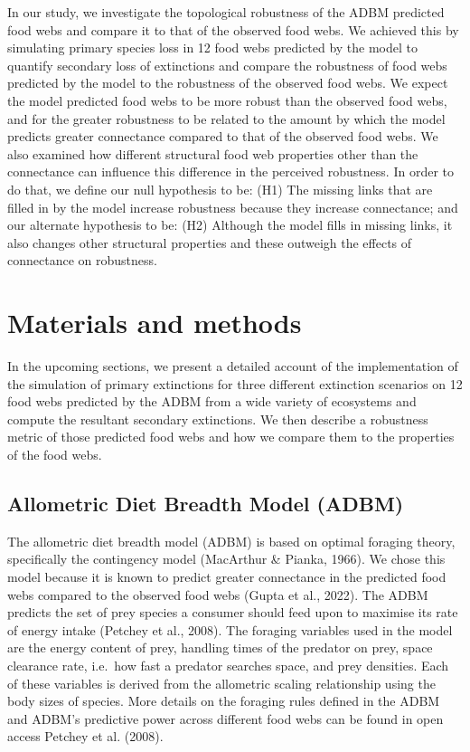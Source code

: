 \documentclass{article}
\begin{document}
In our study, we investigate the topological robustness of the ADBM
predicted food webs and compare it to that of the observed food webs. We
achieved this by simulating primary species loss in 12 food webs
predicted by the model to quantify secondary loss of extinctions and
compare the robustness of food webs predicted by the model to the
robustness of the observed food webs. We expect the model predicted food
webs to be more robust than the observed food webs, and for the greater
robustness to be related to the amount by which the model predicts
greater connectance compared to that of the observed food webs. We also
examined how different structural food web properties other than the
connectance can influence this difference in the perceived robustness.
In order to do that, we define our null hypothesis to be: (H1) The
missing links that are filled in by the model increase robustness
because they increase connectance; and our alternate hypothesis to be:
(H2) Although the model fills in missing links, it also changes other
structural properties and these outweigh the effects of connectance on
robustness.

\hypertarget{materials-and-methods}{%
\section{Materials and methods}\label{materials-and-methods}}

In the upcoming sections, we present a detailed account of the
implementation of the simulation of primary extinctions for three
different extinction scenarios on 12 food webs predicted by the ADBM
from a wide variety of ecosystems and compute the resultant secondary
extinctions. We then describe a robustness metric of those predicted
food webs and how we compare them to the properties of the food webs.

\hypertarget{allometric-diet-breadth-model-adbm}{%
\subsection{Allometric Diet Breadth Model
(ADBM)}\label{allometric-diet-breadth-model-adbm}}

The allometric diet breadth model (ADBM) is based on optimal foraging
theory, specifically the contingency model (MacArthur \& Pianka, 1966).
We chose this model because it is known to predict greater connectance
in the predicted food webs compared to the observed food webs (Gupta et
al., 2022). The ADBM predicts the set of prey species a consumer should
feed upon to maximise its rate of energy intake (Petchey et al., 2008).
The foraging variables used in the model are the energy content of prey,
handling times of the predator on prey, space clearance rate, i.e.~how
fast a predator searches space, and prey densities. Each of these
variables is derived from the allometric scaling relationship using the
body sizes of species. More details on the foraging rules defined in the
ADBM and ADBM's predictive power across different food webs can be found
in open access Petchey et al. (2008).
\end{document}
